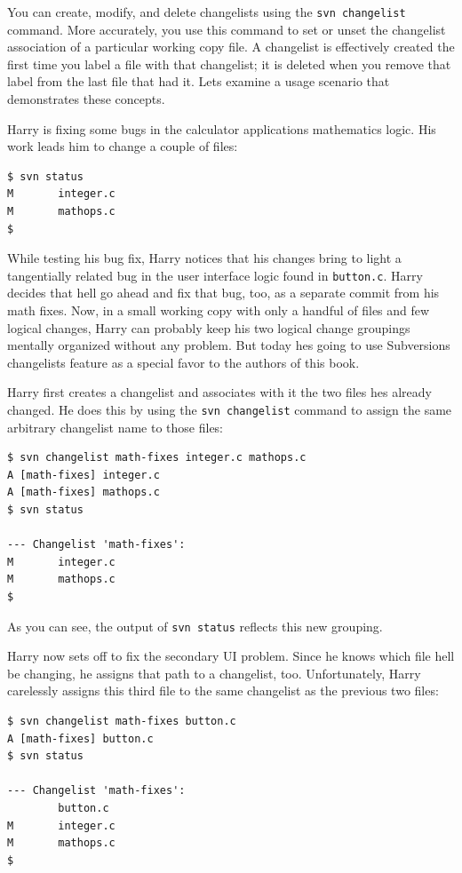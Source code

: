 You can create, modify, and delete changelists using the
\texttt{svn\ changelist} command. More accurately, you use this command
to set or unset the changelist association of a particular working copy
file. A changelist is effectively created the first time you label a
file with that changelist; it is deleted when you remove that label from
the last file that had it. Let\textquotesingle s examine a usage
scenario that demonstrates these concepts.

Harry is fixing some bugs in the calculator
application\textquotesingle s mathematics logic. His work leads him to
change a couple of files:

\begin{verbatim}
$ svn status
M       integer.c
M       mathops.c
$
\end{verbatim}

While testing his bug fix, Harry notices that his changes bring to light
a tangentially related bug in the user interface logic found in
\texttt{button.c}. Harry decides that he\textquotesingle ll go ahead and
fix that bug, too, as a separate commit from his math fixes. Now, in a
small working copy with only a handful of files and few logical changes,
Harry can probably keep his two logical change groupings mentally
organized without any problem. But today he\textquotesingle s going to
use Subversion\textquotesingle s changelists feature as a special favor
to the authors of this book.

Harry first creates a changelist and associates with it the two files
he\textquotesingle s already changed. He does this by using the
\texttt{svn\ changelist} command to assign the same arbitrary changelist
name to those files:

\begin{verbatim}
$ svn changelist math-fixes integer.c mathops.c
A [math-fixes] integer.c
A [math-fixes] mathops.c
$ svn status

--- Changelist 'math-fixes':
M       integer.c
M       mathops.c
$
\end{verbatim}

As you can see, the output of \texttt{svn\ status} reflects this new
grouping.

Harry now sets off to fix the secondary UI problem. Since he knows which
file he\textquotesingle ll be changing, he assigns that path to a
changelist, too. Unfortunately, Harry carelessly assigns this third file
to the same changelist as the previous two files:

\begin{verbatim}
$ svn changelist math-fixes button.c
A [math-fixes] button.c
$ svn status

--- Changelist 'math-fixes':
        button.c
M       integer.c
M       mathops.c
$
\end{verbatim}

